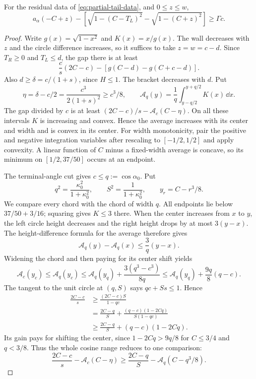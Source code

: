 \begin{proposition}\label{app:partial-circle}
For the residual data of \eqref{eq:partial-tail-data}, and
$0\le z\le w$,
\[
 a_\alpha(-C+z)-
 \left[\sqrt{1-(C-T_L)^2}-\sqrt{1-(C+z)^2}\right]
 \ge\Gamma c.
\]
\end{proposition}
\begin{proof}
Write $g(x)=\sqrt{1-x^2}$ and $K(x)=x/g(x)$.
The wall decreases with $z$ and the circle difference increases,
so it suffices to take $z=w=c-d$. Since $T_R\ge0$ and
$T_L\le d$, the gap there is at least
\[
 \frac cs(2C-c)-[g(C-d)-g(C+c-d)].
\]
Also $d\ge\delta=c/(1+s)$, since $H\le1$.
The bracket decreases with $d$. Put
\[
 \eta=\delta-c/2=\frac{c^3}{2(1+s)^2}\ge c^3/8,
 \qquad \mathcal A_q(y)=\frac1q
       \int_{y-q/2}^{y+q/2}K(x)\,\dd x.
\]
The gap divided by $c$ is at least
$(2C-c)/s-\mathcal A_c(C-\eta)$.
On all these intervals $K$ is increasing and convex. Hence the
average increases with its center and width and is convex in its
center. For width monotonicity, pair the positive and negative integration
variables after rescaling to $[-1/2,1/2]$ and apply convexity. A linear function of
$C$ minus a fixed-width average is concave, so its minimum on
$[1/2,37/50]$ occurs at an endpoint.

The terminal-angle cut gives $c\le q:=\cos\alpha_0$. Put
\[
 q^2=\frac{\kappa_0^2}{1+\kappa_0^2},\qquad
 S^2=\frac1{1+\kappa_0^2},\qquad y_r=C-r^3/8.
\]
We compare every chord with the chord of width $q$.
All endpoints lie below $37/50+3/16$; squaring gives $K\le3$ there.
When the center increases from $x$ to $y$, the left circle height
decreases and the right height drops by at most $3(y-x)$.
The height-difference formula for the average therefore gives
\[
 \mathcal A_q(y)-\mathcal A_q(x)\le\frac3q(y-x).
\]
Widening the chord and then paying for its center shift yields
\[
 \mathcal A_c(y_c)\le\mathcal A_q(y_c)
 \le\mathcal A_q(y_q)+\frac{3(q^3-c^3)}{8q}
 \le\mathcal A_q(y_q)+\frac{9q}{8}(q-c).
\]
The tangent to the unit circle at $(q,S)$ says $qc+Ss\le1$.
Hence
\[
 \begin{aligned}
 \frac{2C-c}{s}
 &\ge\frac{(2C-c)S}{1-qc}\\
 &=\frac{2C-q}{S}
   +\frac{(q-c)(1-2Cq)}{S(1-qc)}\\
 &\ge\frac{2C-q}{S}+(q-c)(1-2Cq).
 \end{aligned}
\]
Its gain pays for shifting the center, since
$1-2Cq>9q/8$ for $C\le3/4$ and $q<3/8$.
Thus the whole cosine range reduces to one comparison:
\[
 \frac{2C-c}{s}-\mathcal A_c(C-\eta)
 \ge\frac{2C-q}{S}-\mathcal A_q(C-q^3/8).
\]


\end{proof}
